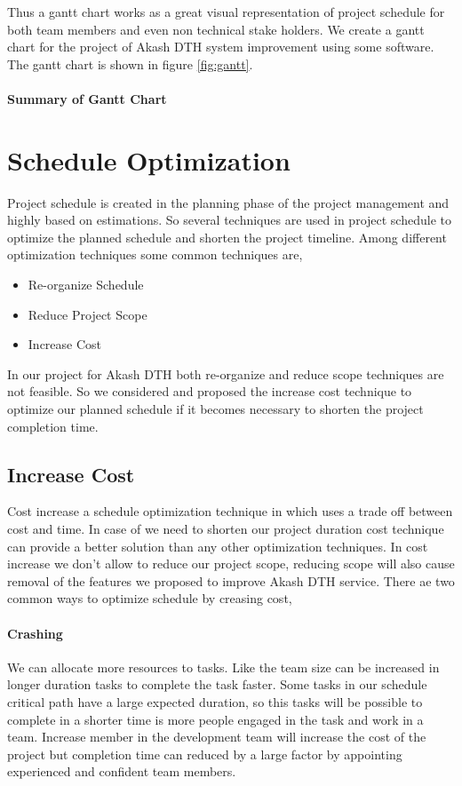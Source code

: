 \begin{spacing}{1}
Thus a gantt chart works as a great visual representation of project schedule for both team members and even non technical stake holders. We create a gantt chart for the project of Akash DTH system improvement using some software. The gantt chart is shown in figure \ref{fig:gantt}.

\paragraph{Summary of Gantt Chart}



\section{Schedule Optimization}
Project schedule is created in the planning phase of the project management and highly based on estimations. So several techniques are used in project schedule to optimize the planned schedule and shorten the project timeline. Among different optimization techniques some common techniques are,
\begin{itemize}
	\item Re-organize Schedule
	\item Reduce Project Scope
	\item Increase Cost
\end{itemize}
In our project for Akash DTH both re-organize and reduce scope techniques are not feasible. So we considered and proposed the increase cost technique to optimize our planned schedule if it becomes necessary to shorten the project completion time. 

\subsection{Increase Cost}
Cost increase a schedule optimization technique in which uses a trade off between cost and time. In case of we need to shorten our project duration cost technique can provide a better solution than any other optimization techniques. In cost increase we don't allow to reduce our project scope, reducing scope will also cause removal of the features we proposed to improve Akash DTH service. There ae two common ways to optimize schedule by creasing cost,
\paragraph{Crashing} We can allocate more resources to tasks. Like the team size can be increased in longer duration tasks to complete the task faster. Some tasks in our schedule critical path have a large expected duration, so this tasks will be possible to complete in a shorter time is more people engaged in the task and work in a team. Increase member in the development team will increase the cost of the project but completion time can reduced by a large factor by appointing experienced and confident team members.

\end{spacing}
